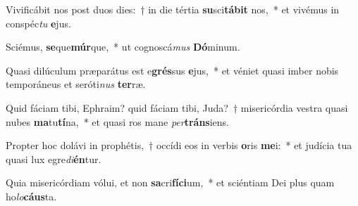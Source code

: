 \item Vivificábit nos post duos dies:~† in die tértia \textbf{su}sci\textbf{tá}\textbf{bit} nos,~* et vivémus in conspéc\textit{tu} \textbf{e}jus.
\item Sciémus, \textbf{se}que\textbf{múr}que,~* ut cognoscá\textit{mus} \textbf{Dó}minum.
\item Quasi dilúculum præparátus est e\textbf{grés}sus \textbf{e}jus,~* et véniet quasi imber nobis temporáneus et seróti\textit{nus} \textbf{ter}ræ.
\item Quid fáciam tibi, Ephraim? quid fáciam tibi, Juda?~† misericórdia vestra quasi nubes \textbf{ma}tu\textbf{tí}na,~* et quasi ros mane \textit{per}\textbf{tráns}iens.
\item Propter hoc dolávi in prophétis,~† occídi eos in verbis \textbf{o}ris \textbf{me}i:~* et judícia tua quasi lux egre\textit{di}\textbf{én}tur.
\item Quia misericórdiam vólui, et non \textbf{sa}cri\textbf{fí}\textbf{ci}um,~* et sciéntiam Dei plus quam ho\textit{lo}\textbf{cáus}ta.
